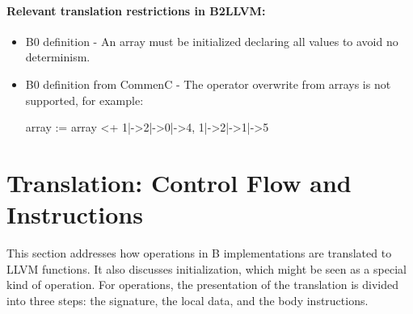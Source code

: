 \documentclass{llncs}
\begin{document}
\paragraph{Relevant translation restrictions in B2LLVM:}
\begin{itemize}
\item  B0 definition - An array must be initialized declaring all values 
to avoid no determinism.
\item B0 definition from CommenC - The operator overwrite from arrays is not supported, for example:

\begin{pascalcode}
array := array <+ {1|->2|->0|->4,  1|->2|->1|->5}
\end{pascalcode}

\end{itemize}





\section{Translation: Control Flow and Instructions
\label{sec:control}}

This section addresses how operations in B implementations are translated to
LLVM functions. It also discusses initialization, which might be seen as a
special kind of operation. For operations, the presentation of the translation
is divided into three steps: the signature, the local data, and the body
instructions.
\end{document}
